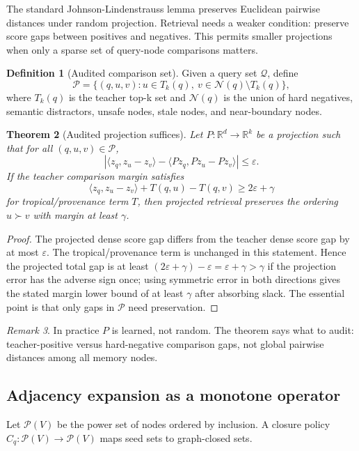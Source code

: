 \documentclass[11pt]{article}
\newtheorem{theorem}{Theorem}[section]
\theoremstyle{definition}
\newtheorem{definition}[theorem]{Definition}
\theoremstyle{remark}
\newtheorem{remark}[theorem]{Remark}
\newcommand{\R}{\mathbb{R}}
\newcommand{\eps}{\varepsilon}
\begin{document}
The standard Johnson-Lindenstrauss lemma preserves Euclidean pairwise distances under random projection. Retrieval needs a weaker condition: preserve score gaps between positives and negatives. This permits smaller projections when only a sparse set of query-node comparisons matters.

\begin{definition}[Audited comparison set]
Given a query set \(\mathcal Q\), define
\[
    \mathcal P=\{(q,u,v): u\in T_k(q),\ v\in \mathcal N(q)\setminus T_k(q)\},
\]
where \(T_k(q)\) is the teacher top-k set and \(\mathcal N(q)\) is the union of hard negatives, semantic distractors, unsafe nodes, stale nodes, and near-boundary nodes.
\end{definition}

\begin{theorem}[Audited projection suffices]
Let \(P:\R^d\to\R^k\) be a projection such that for all \((q,u,v)\in\mathcal P\),
\[
    \left|\langle z_q,z_u-z_v\rangle-\langle Pz_q,Pz_u-Pz_v\rangle\right|\le \eps.
\]
If the teacher comparison margin satisfies
\[
    \langle z_q,z_u-z_v\rangle + T(q,u)-T(q,v) \ge 2\eps+\gamma
\]
for tropical/provenance term \(T\), then projected retrieval preserves the ordering \(u\succ v\) with margin at least \(\gamma\).
\end{theorem}
\begin{proof}
The projected dense score gap differs from the teacher dense score gap by at most \(\eps\). The tropical/provenance term is unchanged in this statement. Hence the projected total gap is at least \((2\eps+\gamma)-\eps=\eps+\gamma>\gamma\) if the projection error has the adverse sign once; using symmetric error in both directions gives the stated margin lower bound of at least \(\gamma\) after absorbing slack. The essential point is that only gaps in \(\mathcal P\) need preservation.
\end{proof}

\begin{remark}
In practice \(P\) is learned, not random. The theorem says what to audit: teacher-positive versus hard-negative comparison gaps, not global pairwise distances among all memory nodes.
\end{remark}

\subsection{Adjacency expansion as a monotone operator}

Let \(\mathcal P(V)\) be the power set of nodes ordered by inclusion. A closure policy \(C_q:\mathcal P(V)\to\mathcal P(V)\) maps seed sets to graph-closed sets.
\end{document}
